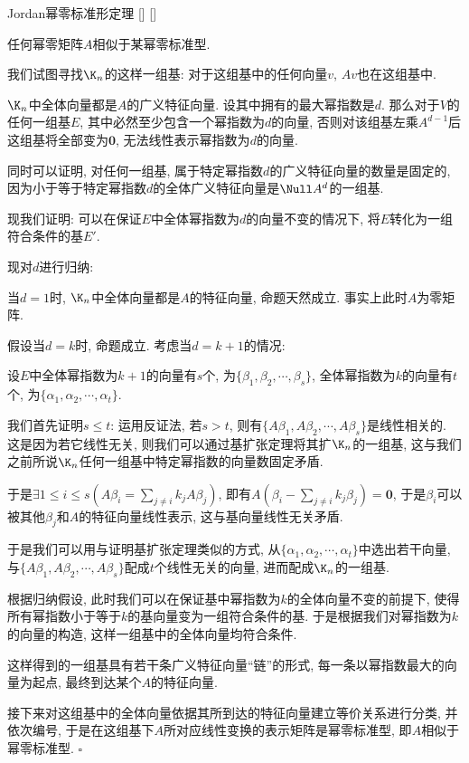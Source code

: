 \documentclass[UTF8]{ctexart}
\begin{document}
		\begin{thm}
			[]
			{Jordan幂零标准形定理}
			[]
			[]

			任何幂零矩阵$A$相似于某幂零标准型. 
		\end{thm}

		\begin{prf}

			我们试图寻找$\K_n$的这样一组基: 对于这组基中的任何向量$v$, $Av$也在这组基中. 

			$\K_n$中全体向量都是$A$的广义特征向量. 设其中拥有的最大幂指数是$d$. 那么对于$V$的任何一组基$E$, 其中必然至少包含一个幂指数为$d$的向量, 否则对该组基左乘$A^{d-1}$后这组基将全部变为$\mathbf{0}$, 无法线性表示幂指数为$d$的向量. 

			同时可以证明, 对任何一组基, 属于特定幂指数$d$的广义特征向量的数量是固定的, 因为小于等于特定幂指数$d$的全体广义特征向量是$\Null A^d$的一组基. 

			现我们证明: 可以在保证$E$中全体幂指数为$d$的向量不变的情况下, 将$E$转化为一组符合条件的基$E'$. 

			现对$d$进行归纳: 

			当$d=1$时, $\K_n$中全体向量都是$A$的特征向量, 命题天然成立. 事实上此时$A$为零矩阵. 

			假设当$d=k$时, 命题成立. 考虑当$d=k+1$的情况: 
			
			设$E$中全体幂指数为$k+1$的向量有$s$个, 为$\{\beta_1,\beta_2,\cdots,\beta_s\}$, 全体幂指数为$k$的向量有$t$个, 为$\{\alpha_1,\alpha_2,\cdots,\alpha_t\}$. 

			我们首先证明$s\leq t$: 运用反证法, 若$s>t$, 则有$\{A\beta_1,A\beta_2,\cdots, A\beta_s\}$是线性相关的. 这是因为若它线性无关, 则我们可以通过基扩张定理将其扩$\K_n$的一组基, 这与我们之前所说$\K_n$任何一组基中特定幂指数的向量数固定矛盾. 
			
			于是$\exists 1\leq i\leq s(A\beta_i =\sum\limits_{j\neq i}k_j A\beta_j)$, 即有$A(\beta_i-\sum\limits_{j\neq i}k_j \beta_j)=\mathbf{0}$, 于是$\beta_i$可以被其他$\beta_j$和$A$的特征向量线性表示, 这与基向量线性无关矛盾. 

			于是我们可以用与证明基扩张定理类似的方式, 从$\{\alpha_1,\alpha_2,\cdots,\alpha_t\}$中选出若干向量, 与$\{A\beta_1,A\beta_2,\cdots,A\beta_s\}$配成$t$个线性无关的向量, 进而配成$\K_n$的一组基. 

			根据归纳假设, 此时我们可以在保证基中幂指数为$k$的全体向量不变的前提下, 使得所有幂指数小于等于$k$的基向量变为一组符合条件的基. 于是根据我们对幂指数为$k$的向量的构造, 这样一组基中的全体向量均符合条件. 

			这样得到的一组基具有若干条广义特征向量``链''的形式, 每一条以幂指数最大的向量为起点, 最终到达某个$A$的特征向量. 

			接下来对这组基中的全体向量依据其所到达的特征向量建立等价关系进行分类, 并依次编号, 于是在这组基下$A$所对应线性变换的表示矩阵是幂零标准型, 即$A$相似于幂零标准型. $\square$
		\end{prf}
\end{document}
